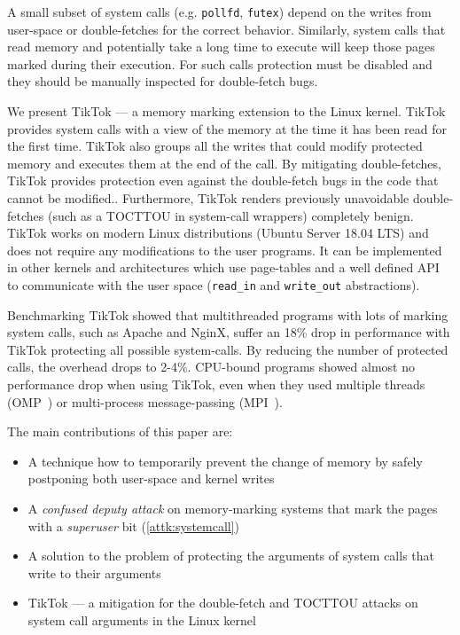 \documentclass[conference]{IEEEtran}
\newcommand{\sysname}{TikTok}
\newcommand{\roughevaloverheadbad}{18\%}
\newcommand{\roughevaloverheadbetter}{2-4\%}
\begin{document}
A small subset of system calls (e.g. \texttt{pollfd}, \texttt{futex})
depend on the writes from user-space or double-fetches for the correct behavior.
Similarly, system calls that read memory and potentially take a long time to
execute will keep those pages marked during their execution. For such calls
protection must be disabled and they should be manually inspected for
double-fetch bugs.


We present \sysname{} --- a memory marking extension to the Linux kernel.
\sysname{} provides system calls with a view of the memory at the time it has
been read for the first time. \sysname{} also groups all the writes that could
modify protected memory and executes them at the end of the call. By mitigating
double-fetches, \sysname{} provides protection even against the double-fetch
bugs in the code that cannot be modified.. Furthermore, \sysname{} renders
previously unavoidable double-fetches (such as a TOCTTOU in system-call
wrappers) completely benign. \sysname{} works on modern Linux distributions
(Ubuntu Server 18.04 LTS) and does not require any modifications to the user
programs. It can be implemented in other kernels and architectures which use
page-tables and a well defined API to communicate with the user space
(\texttt{read\_in} and \texttt{write\_out} abstractions).


Benchmarking \sysname{} showed that multithreaded programs with lots of marking
system calls, such as Apache and NginX, suffer an \roughevaloverheadbad{} drop
in performance with \sysname{} protecting all possible system-calls. By reducing
the number of protected calls, the overhead drops to \roughevaloverheadbetter{}.
CPU-bound programs showed almost no performance drop when using \sysname{}, even
when they used multiple threads (OMP~\cite{dagum1998openmp}) or multi-process
message-passing (MPI~\cite{snir1998mpi}).



The main contributions of this paper are:

\begin{itemize}
\item A technique how to temporarily prevent the change of memory by safely
      postponing both user-space and kernel writes
\item A \emph{confused deputy attack} on memory-marking systems that mark the pages with a \emph{superuser} bit (\autoref{attk:systemcall})
\item A solution to the problem of protecting the arguments of system calls that write to their arguments
\item \sysname{} --- a mitigation for the double-fetch and TOCTTOU attacks on system
      call arguments in the Linux kernel
\end{itemize}
\end{document}
